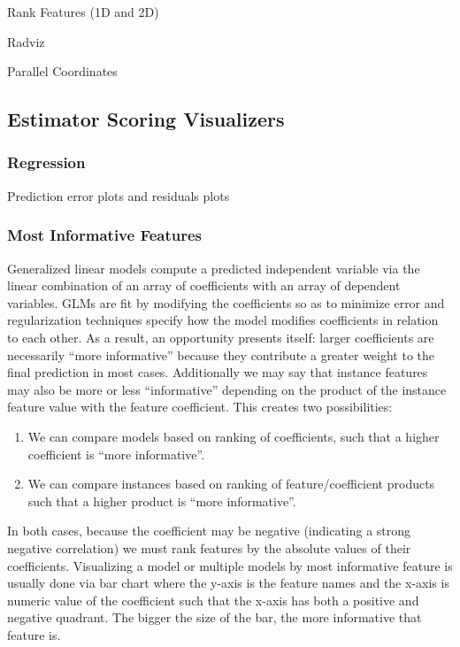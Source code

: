 \documentclass{sigkddExp}
\begin{document}
Rank Features (1D and 2D) \cite{seo_rank-by-feature_2005}

Radviz \cite{hoffman_dna_1997,hoffman_dimensional_1999}

Parallel Coordinates \cite{fua_hierarchical_1999}

\subsection{Estimator Scoring Visualizers}

\subsubsection{Regression}

Prediction error plots and residuals plots \cite{larsen_use_1972}

\subsubsection{Most Informative Features}

Generalized linear models compute a predicted independent variable via the linear combination of an array of coefficients with an array of dependent variables. GLMs are fit by modifying the coefficients so as to minimize error and regularization techniques specify how the model modifies coefficients in relation to each other. As a result, an opportunity presents itself: larger coefficients are necessarily ``more informative'' because they contribute a greater weight to the final prediction in most cases. Additionally we may say that instance features may also be more or less ``informative'' depending on the product of the instance feature value with the feature coefficient. This creates two possibilities:

\begin{enumerate}
    \item We can compare models based on ranking of coefficients, such that a higher coefficient is ``more informative''.
    \item We can compare instances based on ranking of feature/coefficient products such that a higher product is ``more informative''.
\end{enumerate}

In both cases, because the coefficient may be negative (indicating a strong negative correlation) we must rank features by the absolute values of their coefficients. Visualizing a model or multiple models by most informative feature is usually done via bar chart where the y-axis is the feature names and the x-axis is numeric value of the coefficient such that the x-axis has both a positive and negative quadrant. The bigger the size of the bar, the more informative that feature is.
\end{document}

